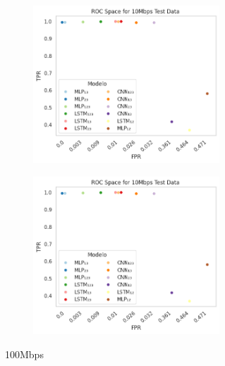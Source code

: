 \documentclass[a4paper,fleqn]{cas-sc}
\begin{document}
\begin{figure}
\begin{subcaptiongroup}
\begin{subfigure}[t]{.4\textwidth}
\begin{subcaptiongroup}
\begin{subfigure}[t]{0.3\textwidth}
		\end{subfigure}
		\begin{subfigure}[t]{0.3\textwidth}
			\includegraphics[width=\textwidth]{./figs/ROC-Space-Test-Data-10Mbps.png}
		\end{subfigure}
		\begin{subfigure}[t]{0.3\textwidth}
			\includegraphics[width=\textwidth]{./figs/ROC-Space-Test-Data-10Mbps.png}
		\end{subfigure}
	\end{subcaptiongroup}
	\captionsetup{subrefformat=parens}
	\caption{100Mbps}
	\end{subfigure}%
  \end{subcaptiongroup}
	\captionsetup{subrefformat=parens}
	\caption{}
	\end{figure}


	
\end{document}
